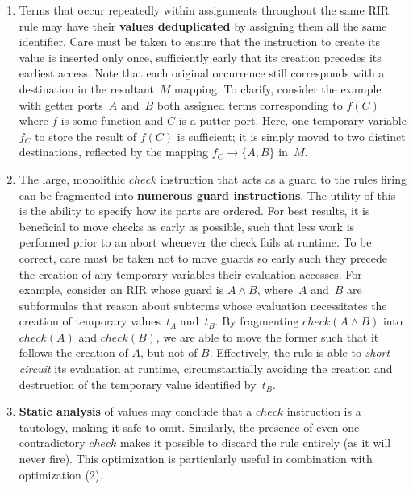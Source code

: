 \begin{enumerate}
	\item Terms that occur repeatedly within assignments throughout the same RIR rule may have their \textbf{values deduplicated} by assigning them all the same identifier. Care must be taken to ensure that the instruction to create its value is inserted only once, sufficiently early that its creation precedes its earliest access. Note that each original occurrence still corresponds with a destination in the resultant~$M$ mapping. To clarify, consider the example with getter ports~$A$ and~$B$ both assigned terms corresponding to $f(C)$ where $f$ is some function and $C$ is a putter port. Here, one temporary variable $f_C$ to store the result of $f(C)$ is sufficient; it is simply moved to two distinct destinations, reflected by the mapping $f_C\rightarrow\{A,B\}$ in~$M$.
	
	\item The large, monolithic $check$ instruction that acts as a guard to the rules firing can be fragmented into \textbf{numerous guard instructions}. The utility of this is the ability to specify how its parts are ordered. For best results, it is beneficial to move checks as early as possible, such that less work is performed prior to an abort whenever the check fails at runtime. To be correct, care must be taken not to move guards so early such they precede the creation of any temporary variables their evaluation accesses. For example, consider an RIR 
	whose guard is $A\wedge{}B$, where~$A$ and~$B$ are subformulas that reason about subterms whose evaluation necessitates the creation of temporary values~$t_A$ and~$t_B$. By fragmenting $check(A\wedge{}B)$ into $check(A)$ and $check(B)$, we are able to move the former such that it follows the creation of $A$, but not of $B$. Effectively, the rule is able to \textit{short circuit} its evaluation at runtime, circumstantially avoiding the creation and destruction of the temporary value identified by~$t_B$. 
	
	\item \textbf{Static analysis} of values may conclude that a $check$ instruction is a tautology, making it safe to omit. Similarly, the presence of even one contradictory $check$ makes it possible to discard the rule entirely (as it will never fire). This optimization is particularly useful in combination with optimization (2).
\end{enumerate}

